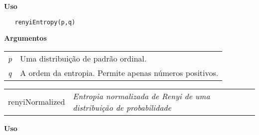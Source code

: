 \documentclass[12pt,letterpaper]{article}
\begin{document}
\vspace{-0.5cm}

\hrulefill  

\vspace{0.5cm}

\textbf{Uso}

\begin{lstlisting}
   renyiEntropy(p,q)
\end{lstlisting}

\vspace{0.5cm}

\textbf{Argumentos}

\begin{table}[!h]
\begin{center}
\begin{tabularx}{\textwidth}{X X}
\hspace{0.5cm} \textit{p} \vspace{0.5cm}& Uma distribuição de padrão ordinal.\vspace{0.5cm}\\
\hspace{0.5cm} \textit{q} \vspace{0.5cm}& A ordem da entropia. Permite apenas números positivos.\vspace{0.5cm}\\
\end{tabularx}
\end{center}
\end{table} 
\newpage


\hrulefill   

\begin{table}[!h]
\begin{center}
\begin{tabularx}{\textwidth}{ X X}
\hspace{0.5cm} renyiNormalized & \textit{Entropia normalizada de Renyi de uma distribuição de probabilidade}\\
\end{tabularx}
\end{center}
\end{table} 

\vspace{-0.5cm}

\hrulefill  

\vspace{0.5cm}

\textbf{Uso}
\end{document}
